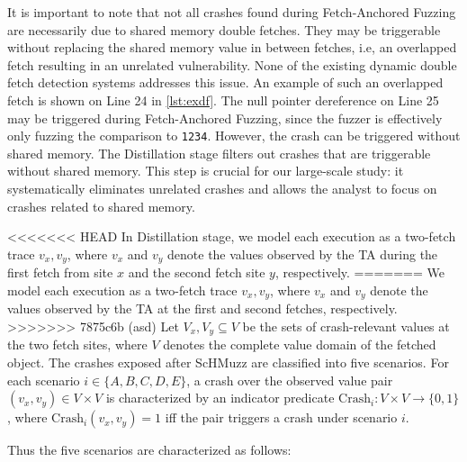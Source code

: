 \documentclass[conference]{IEEEtran}
\newcommand{\sysname}{ScHMuzz\xspace}
\newcommand{\stagetwo}{Fetch-Anchored Fuzzing\xspace}
\newcommand{\stagethree}{Distillation\xspace}
\begin{document}
It is important to note that not all crashes found during \stagetwo are necessarily 
due to shared memory double fetches. 
They may be triggerable without replacing the shared 
memory value in between fetches, i.e, an overlapped fetch resulting in an unrelated vulnerability. 
None of the existing dynamic double fetch detection systems addresses this issue.
An example of such an overlapped fetch is shown on Line 24 in \autoref{lst:exdf}. The null 
pointer dereference on Line 25 may be triggered during \stagetwo, since the fuzzer 
is effectively only fuzzing the comparison to \texttt{1234}.
However, the crash can be triggered without shared memory.
The \stagethree stage filters out crashes that are triggerable without shared memory.
This step is crucial for our large-scale study: it systematically eliminates unrelated 
crashes and allows the analyst to focus on crashes related to shared memory.

<<<<<<< HEAD
In \stagethree stage, we model each execution as a two-fetch trace \(v_x,v_y\), 
where $v_x$ and $v_y$ denote the values observed by the TA during the first fetch from site $x$ and the second fetch site $y$, respectively.
=======
We model each execution as a two-fetch trace \(v_x,v_y\), 
where $v_x$ and $v_y$ denote the values observed by the TA at the first and second fetches, respectively. 
>>>>>>> 7875c6b (asd)
Let
\(V_x,V_y\subseteq V\) be the sets of crash-relevant values at the two
fetch sites, where $V$ denotes the complete value domain of the fetched object. 
The crashes exposed after \sysname are classified into
five scenarios.
For each scenario $i\in\{A,B,C,D,E\}$, a crash over the observed value pair $(v_x,v_y)\in V\times V$ is characterized by an indicator predicate $\mathrm{Crash}_i: V\times V\to\{0,1\}$, where $\mathrm{Crash}_i(v_x,v_y)=1$ iff the pair triggers a crash under scenario $i$.



Thus the five scenarios are characterized as follows:
\end{document}
